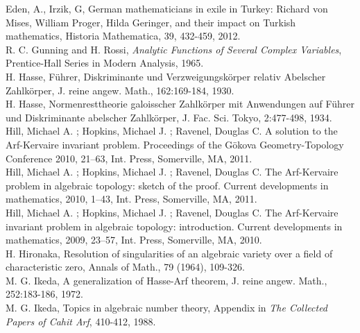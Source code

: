 \documentclass[12pt]{amsart}
\begin{document}
\begin{thebibliography}{10}
 Eden, A., Irzik, G, German mathematicians in exile in Turkey: Richard von Mises, William Proger, Hilda Geringer, and their impact on Turkish mathematics, Historia Mathematica, 39, 432-459, 2012. \\

 R. C. Gunning and H. Rossi,
{\it Analytic Functions of Several Complex Variables}, Prentice-Hall Series in Modern Analysis, 1965.\\

 H. Hasse, F\"{u}hrer, Diskriminante und Verzweigungsk\"{o}rper relativ Abelscher Zahlk\"{o}rper, J. reine angew. Math., 162:169-184, 1930. \\

 H. Hasse, Normenresttheorie galoisscher Zahlk\"{o}rper mit Anwendungen auf F\"{u}hrer und Diskriminante abelscher Zahlk\"{o}rper, J. Fac. Sci. Tokyo, 2:477-498, 1934. \\

  Hill, Michael A. ;  Hopkins, Michael J. ;  Ravenel, Douglas C.  A solution to the Arf-Kervaire invariant problem.
 Proceedings of the G\"{o}kova Geometry-Topology Conference 2010,
 21--63, Int. Press, Somerville, MA,  2011.\\
		
  Hill, Michael A. ;  Hopkins, Michael J. ;  Ravenel, Douglas C.  The Arf-Kervaire problem in algebraic topology: sketch of the
 proof.
 Current developments in mathematics, 2010,
 1--43, Int. Press, Somerville, MA,  2011.\\
		
  Hill, Michael A. ;  Hopkins, Michael J. ;  Ravenel, Douglas C.  The Arf-Kervaire invariant problem in algebraic topology:
 introduction.
 Current developments in mathematics, 2009,
 23--57, Int. Press, Somerville, MA,  2010.\\

 H. Hironaka, Resolution of singularities of an algebraic variety over a field of characteristic zero, Annals of Math., 79 (1964), 109-326.\\

 M. G. Ikeda, A generalization of Hasse-Arf theorem, J. reine angew. Math., 252:183-186, 1972. \\

 M. G. Ikeda, Topics in algebraic number theory, Appendix in {\it The Collected Papers of Cahit Arf}, 410-412, 1988. \\


\end{thebibliography}
\end{document}
